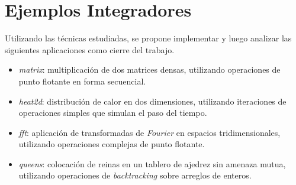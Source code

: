\documentclass[a4paper,twocolumn]{article}
\begin{document}
\appendix

\section{Ejemplos Integradores}

Utilizando las t\'ecnicas estudiadas, se propone implementar y luego analizar las
siguientes aplicaciones como cierre del trabajo.

\begin{itemize}

\item \emph{matrix}: multiplicaci\'on de dos matrices densas, utilizando operaciones
  de punto flotante en forma secuencial.

\item \emph{heat2d}: distribuci\'on de calor en dos dimensiones, utilizando
  iteraciones de operaciones simples que simulan el paso del tiempo.

\item \emph{fft}: aplicaci\'on de transformadas de {\it Fourier} en espacios tridimensionales, utilizando
  operaciones complejas de punto flotante.

\item \emph{queens}: colocaci\'on de reinas en un tablero de
  ajedrez sin amenaza mutua, utilizando operaciones de {\it backtracking} sobre arreglos de enteros.

\end{itemize}
\end{document}
